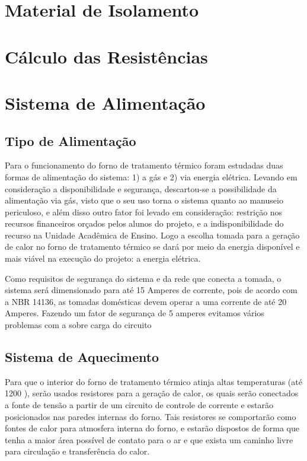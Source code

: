  
\section{Material de Isolamento}


\section{Cálculo das Resistências}

\section{Sistema de Alimentação}

\subsection{Tipo de Alimentação}

Para o funcionamento do forno de tratamento térmico foram estudadas duas formas de alimentação do sistema: 1) a gás e 2) via energia elétrica. Levando em consideração a disponibilidade e segurança, descartou-se a possibilidade da alimentação via gás, visto que o seu uso torna o sistema quanto ao manuseio periculoso, e além disso outro fator foi levado em consideração: restrição nos recursos financeiros orçados pelos alunos do projeto, e a indisponibilidade do recurso na Unidade Acadêmica de Ensino. Logo a escolha tomada para a geração de calor no forno de tratamento térmico se dará por meio da energia disponível e mais viável na execução do projeto: a energia elétrica. 

Como requisitos de segurança do sistema e da rede que conecta a tomada, o sistema será dimensionado para até 15 Amperes de corrente, pois de acordo com a NBR 14136, as tomadas domésticas devem operar a uma corrente de até 20 Amperes. Fazendo um fator de segurança de 5 amperes evitamos vários problemas com a sobre carga do circuito

\subsection{Sistema de Aquecimento}

Para que o interior do forno de tratamento térmico atinja altas temperaturas (até 1200 ), serão usados resistores para a geração de calor, os quais serão conectados a fonte de tensão a partir de um circuito de controle de corrente e estarão posicionados nas paredes internas do forno. Tais resistores se comportarão como fontes de calor para atmosfera interna do forno, e estarão dispostos de forma que tenha a maior área possível de contato para o ar e que exista um caminho livre para circulação e transferência do calor.

